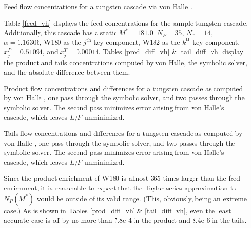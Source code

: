 \documentclass[preprint,12pt]{elsarticle}
\newcommand{\nuc}[2]{{#1}{#2}}
\newcommand{\jth}[0]{$j^{\mbox{th}}$ }
\newcommand{\kth}[0]{$k^{\mbox{th}}$ }
\begin{document}
\begin{table}[htbp]
\begin{center}
\caption{Feed flow concentrations for a tungsten cascade via von Halle 
    \cite{VonHalle1987}.}

\label{feed_vh}
\end{center}
\end{table}

Table \ref{feed_vh} displays the feed concentrations for the sample tungsten cascade.
Additionally, this cascade has a static $M^*=181.0$, $N_P=35$, $N_T=14$,
$\alpha=1.16306$, \nuc{W}{180} as the \jth key component, \nuc{W}{182} as the \kth
key component, $x_j^P=0.51094$, and $x_j^T=0.00014$.  Tables \ref{prod_diff_vh} \&
\ref{tail_diff_vh} display the product and tails concentrations computed by von Halle, 
the symbolic solver, and the absolute difference between them.

\begin{table}[htbp]
\begin{center}
\caption{Product flow concentrations and differences for a tungsten cascade as 
computed by  von Halle \cite{VonHalle1987}, one pass through the symbolic solver, 
and two passes through the symbolic solver.  The second pass minimizes error arising
from von Halle's cascade, which leaves $L/F$ unminimized.}

\label{prod_diff_vh}
\end{center}
\end{table}


\begin{table}[htbp]
\begin{center}
\caption{Tails flow concentrations and differences for a tungsten cascade as 
computed by  von Halle \cite{VonHalle1987}, one pass through the symbolic solver, 
and two passes through the symbolic solver.  The second pass minimizes error arising 
from von Halle's cascade, which leaves $L/F$ unminimized.}

\label{tail_diff_vh}
\end{center}
\end{table}

Since the product enrichment of \nuc{W}{180} is almost 365 times larger than the feed
enrichment, it is reasonable to expect that the Taylor series approximation to 
$N_P(M^*)$ would be outside of its valid range.  (This, obviously, being an extreme
case.)  As is shown in Tables \ref{prod_diff_vh} \& \ref{tail_diff_vh},  
even the least accurate case is off by no more than 7.8e-4 in the product and 
8.4e-6 in the tails.  
\end{document}
